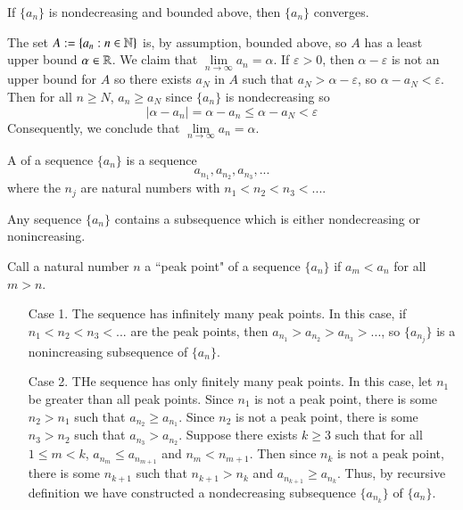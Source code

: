 \documentclass[12pt]{report}
\begin{document}
\begin{thm}{}{}
    If $\{a_n\}$ is nondecreasing and bounded above, then $\{a_n\}$ converges.
\end{thm}
\begin{proof*}{}{}
    The set $A := \{a_n:n\in\mathbb N\}$ is, by assumption, bounded above, so $A$ has a least upper bound $\alpha \in \mathbb R$. We claim that $\lim\limits_{n\rightarrow \infty}a_n = \alpha$. If $\varepsilon > 0$, then $\alpha - \varepsilon$ is not an upper bound for $A$ so there exists $a_N$ in $A$ such that $a_N > \alpha - \varepsilon$, so $\alpha - a_N < \varepsilon$. Then for all $n \geq N$, $a_n \geq a_N$ since $\{a_n\}$ is nondecreasing so \begin{equation*}
        |\alpha - a_n| = \alpha - a_n \leq \alpha - a_N < \varepsilon
    \end{equation*}
    Consequently, we conclude that $\lim\limits_{n\rightarrow \infty}a_n = \alpha$.
\end{proof*}


\begin{defn}{}{}
    A  of a sequence $\{a_n\}$ is a sequence \begin{equation*}
        a_{n_1},a_{n_2},a_{n_3},...
    \end{equation*}
    where the $n_j$ are natural numbers with $n_1 < n_2 < n_3 < ...$.
\end{defn}

\begin{lem}{}{}
    Any sequence $\{a_n\}$ contains a subsequence which is either nondecreasing or nonincreasing.
\end{lem}
\begin{proof*}{}{}
    Call a natural number $n$ a ``peak point" of a sequence $\{a_n\}$ if $a_m < a_n$ for all $m > n$.\begin{itemize}[leftmargin=+1in]
        \item[Case 1.] The sequence has infinitely many peak points. In this case, if $n_1 < n_2 < n_3 < ...$ are the peak points, then $a_{n_1} > a_{n_2} > a_{n_3} > ...$, so $\{a_{n_j}\}$ is a nonincreasing subsequence of $\{a_n\}$.
        \item[Case 2.] THe sequence has only finitely many peak points. In this case, let $n_1$ be greater than all peak points. Since $n_1$ is not a peak point, there is some $n_2 > n_1$ such that $a_{n_2} \geq a_{n_1}$. Since $n_2$ is not a peak point, there is some $n_3 > n_2$ such that $a_{n_3} > a_{n_2}$. Suppose there exists $k \geq 3$ such that for all $1 \leq m < k$, $a_{n_m} \leq a_{n_{m+1}}$ and $n_m < n_{m+1}$. Then since $n_k$ is not a peak point, there is some $n_{k+1}$ such that $n_{k+1} > n_k$ and $a_{n_{k+1}} \geq a_{n_k}$. Thus, by recursive definition we have constructed a nondecreasing subsequence $\{a_{n_k}\}$ of $\{a_n\}$.
    \end{itemize}
\end{proof*}
\end{document}
